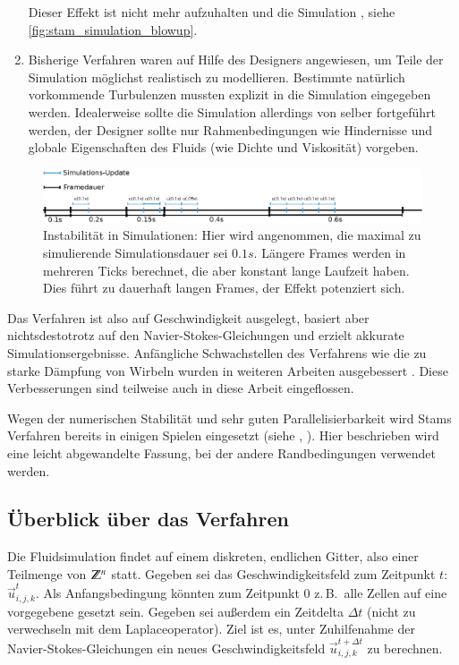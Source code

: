 \begin{enumerate}
	Dieser Effekt ist nicht mehr aufzuhalten und die Simulation
	, siehe
	\autoref{fig:stam_simulation_blowup}.
\item
	Bisherige Verfahren waren auf Hilfe des Designers angewiesen, um Teile
	der Simulation möglichst realistisch zu modellieren. Bestimmte natürlich
	vorkommende Turbulenzen mussten explizit in die Simulation eingegeben
	werden. Idealerweise sollte die Simulation allerdings von selber
	fortgeführt werden, der Designer sollte nur Rahmenbedingungen wie
	Hindernisse und globale Eigenschaften des Fluids (wie Dichte und
	Viskosität) vorgeben.
\end{enumerate}

\begin{figure}[ht]
\includegraphics[width=12cm]{images/simulation_blowup}
\caption{Instabilität in Simulationen: Hier wird angenommen, die maximal zu simulierende Simulationsdauer sei $0.1s$. Längere Frames werden in mehreren Ticks berechnet, die aber konstant lange Laufzeit haben. Dies führt zu dauerhaft langen Frames, der Effekt potenziert sich.}
\label{fig:stam_simulation_blowup}
\end{figure}

Das Verfahren ist also auf Geschwindigkeit ausgelegt, basiert aber
nichtsdestotrotz auf den Navier-Stokes-Gleichungen und erzielt akkurate
Simulationsergebnisse. Anfängliche Schwachstellen des Verfahrens wie die zu
starke Dämpfung von Wirbeln wurden in weiteren Arbeiten ausgebessert
\cite{Foster}. Diese Verbesserungen sind teilweise auch in diese
Arbeit eingeflossen.

Wegen der numerischen Stabilität und sehr guten Parallelisierbarkeit wird Stams
Verfahren bereits in einigen Spielen eingesetzt (siehe \cite{Crane2007},
\cite{Peschel2009}). Hier beschrieben wird eine leicht abgewandelte
Fassung, bei der andere Randbedingungen verwendet werden.

\subsection{Überblick über das Verfahren}

Die Fluidsimulation findet auf einem diskreten, endlichen Gitter, also einer
Teilmenge von $\mathbb{Z}^n$ statt. Gegeben sei das Geschwindigkeitsfeld zum
Zeitpunkt $t$: $\vec{u}_{i,j,k}^t$. Als Anfangsbedingung könnten zum Zeitpunkt $0$
z.\,B.\ alle Zellen auf eine vorgegebene  gesetzt sein.
Gegeben sei außerdem ein Zeitdelta $\Delta t$ (nicht zu verwechseln mit dem
Laplaceoperator). Ziel ist es, unter Zuhilfenahme der
Navier-Stokes-Gleichungen ein neues Geschwindigkeitsfeld $\vec{u}_{i,j,k}^{t+\Delta
t}$ zu berechnen.

